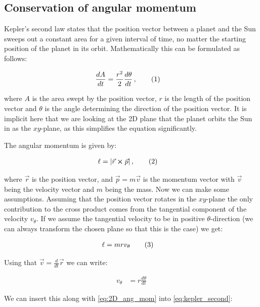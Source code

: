 \documentclass[reprint,english,notitlepage]{revtex4-1}  %
\newcommand\numberthis{\addtocounter{equation}{1}\tag{\theequation}}
\begin{document}
\subsection{Conservation of angular momentum} \label{sec:II:d}

Kepler's second law states that the position vector between a planet and the Sun sweeps out a constant area for a given interval of time, no matter the starting position of the planet in its orbit. Mathematically this can be formulated as follows:

\begin{align*}
\frac{dA}{dt} &= \frac{r^2}{2} \frac{d\theta}{dt} \, , \numberthis \label{eq:kepler_second}
\end{align*}   

where $A$ is the area swept by the position vector, $r$ is the length of the position vector and $\theta$ is the angle determining the direction of the position vector. It is implicit here that we are looking at the 2D plane that the planet orbits the Sun in as the $xy$-plane, as this simplifies the equation significantly. 

The angular momentum is given by:

\begin{align*}
\ell &= |\vec{r} \cross \vec{p}| \, ,\numberthis \label{eq:ang_mom}
\end{align*}

where $\vec{r}$ is the position vector, and $\vec{p} = m \vec{v}$ is the momentum vector with $\vec{v}$ being the velocity vector and $m$ being the mass. Now we can make some assumptions. Assuming that the position vector rotates in the $xy$-plane the only contribution to the cross product comes from the tangential component of the velocity $v_\theta$. If we assume the tangential velocity to be in positive $\theta$-direction (we can always transform the chosen plane so that this is the case) we get:

\begin{align*}
\ell &= mrv_\theta \numberthis \label{eq:2D_ang_mom}
\end{align*}

Using that $\vec{v} = \frac{d}{dt} \vec{r}$ we can write:

\begin{align*}
v_\theta &= r \frac{d\theta}{dt}
\end{align*}

We can insert this along with \eqref{eq:2D_ang_mom} into \eqref{eq:kepler_second}:
\end{document}
